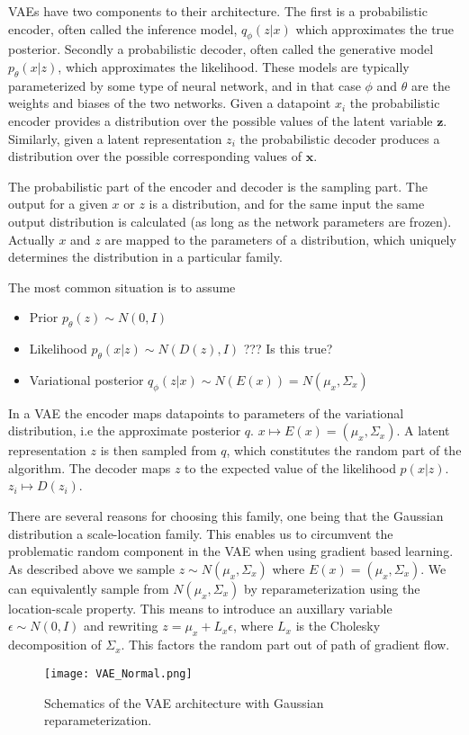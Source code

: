 \documentclass[../../thesis.tex]{subfiles}
\begin{document}
VAEs have two components to their architecture. The first is a probabilistic encoder, often called the inference model, $q_\phi(z|x)$ which approximates the true posterior. Secondly a probabilistic decoder, often called the generative model $p_\theta(x|z)$, which approximates the likelihood. These models are typically parameterized by some type of neural network, and in that case $\phi$ and $\theta$ are the weights and biases of the two networks. Given a datapoint $x_i$ the probabilistic encoder provides a distribution over the possible values of the latent variable $\mathbf{z}$. Similarly, given a latent representation $z_i$ the probabilistic decoder produces a distribution over the possible corresponding values of $\mathbf{x}$. \newline

The probabilistic part of the encoder and decoder is the sampling part. The output for a given $x$ or $z$ is a distribution, and for the same input the same output distribution is calculated (as long as the network parameters are frozen). Actually $x$ and $z$ are mapped to the parameters of a distribution, which uniquely determines the distribution in a particular family.\newline

The most common situation is to assume 
\begin{itemize}
    \item Prior $p_\theta(z)\sim N(0,I)$
    \item Likelihood $p_\theta(x|z)\sim N(D(z), I)$ ??? Is this true? 
    \item Variational posterior $q_\phi(z|x)\sim N(E(x)) = N(\mu_x, \Sigma_x)$
\end{itemize}

In a VAE the encoder maps datapoints to parameters of the variational distribution, i.e the approximate posterior $q$. $x \mapsto E(x) = (\mu_x, \Sigma_x)$. A latent representation $z$ is then sampled from $q$, which constitutes the random part of the algorithm. The decoder maps $z$ to the expected value of the likelihood $p(x|z)$. $z_i \mapsto D(z_i)$. \newline

There are several reasons for choosing this family, one being that the Gaussian distribution a scale-location family. This enables us to circumvent the problematic random component in the VAE when using gradient based learning. As described above we sample $z\sim N(\mu_x,\Sigma_x)$ where $E(x) = (\mu_x,\Sigma_x)$. We can equivalently sample from $N(\mu_x,\Sigma_x)$ by reparameterization using the location-scale property. This means to introduce an auxillary variable $\epsilon \sim N(0,I)$ and rewriting $z = \mu_x + L_x\epsilon $, where $L_x$ is the Cholesky decomposition of $\Sigma_x$. This factors the random part out of path of gradient flow.
\begin{figure}[h]
    \texttt{[image: VAE\_Normal.png]}
    \centering
    \caption{Schematics of the VAE architecture with Gaussian reparameterization.}
    \label{fig:VAE_Normal}
\end{figure}
\end{document}
